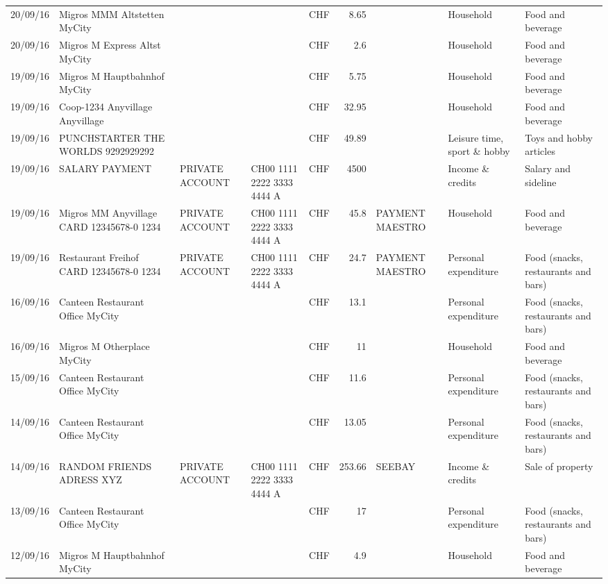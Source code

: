 \begin{landscape}
\begin{table}[h]
\begin{center}
\begin{tabular}{rllllrlll}
		20/09/16 & Migros MMM Altstetten    MyCity &       &       & CHF   & 8.65  &       & Household & Food and beverage \\
		20/09/16 & Migros M Express Altst   MyCity &       &       & CHF   & 2.6   &       & Household & Food and beverage \\
		19/09/16 & Migros M Hauptbahnhof    MyCity &       &       & CHF   & 5.75  &       & Household & Food and beverage \\
		19/09/16 & Coop-1234 Anyvillage    Anyvillage &       &       & CHF   & 32.95 &       & Household & Food and beverage \\
		19/09/16 & PUNCHSTARTER THE WORLDS   9292929292 &       &       & CHF   & 49.89 &       & Leisure time, sport \& hobby & Toys and hobby articles \\
		19/09/16 & SALARY PAYMENT & PRIVATE ACCOUNT & CH00 1111 2222 3333 4444 A & CHF   & 4500  &       & Income \& credits & Salary and sideline \\
		19/09/16 & Migros MM Anyvillage CARD 12345678-0 1234 & PRIVATE ACCOUNT & CH00 1111 2222 3333 4444 A & CHF   & 45.8  & PAYMENT MAESTRO & Household & Food and beverage \\
		19/09/16 & Restaurant Freihof CARD 12345678-0 1234 & PRIVATE ACCOUNT & CH00 1111 2222 3333 4444 A & CHF   & 24.7  & PAYMENT MAESTRO & Personal expenditure & Food (snacks, restaurants and bars) \\
		16/09/16 & Canteen Restaurant Office      MyCity &       &       & CHF   & 13.1  &       & Personal expenditure & Food (snacks, restaurants and bars) \\
		16/09/16 & Migros M Otherplace   MyCity &       &       & CHF   & 11    &       & Household & Food and beverage \\
		15/09/16 & Canteen Restaurant Office      MyCity &       &       & CHF   & 11.6  &       & Personal expenditure & Food (snacks, restaurants and bars) \\
		14/09/16 & Canteen Restaurant Office      MyCity &       &       & CHF   & 13.05 &       & Personal expenditure & Food (snacks, restaurants and bars) \\
		14/09/16 & RANDOM FRIENDS ADRESS XYZ & PRIVATE ACCOUNT & CH00 1111 2222 3333 4444 A & CHF   & 253.66 & SEEBAY & Income \& credits & Sale of property \\
		13/09/16 & Canteen Restaurant Office      MyCity &       &       & CHF   & 17    &       & Personal expenditure & Food (snacks, restaurants and bars) \\
		12/09/16 & Migros M Hauptbahnhof    MyCity &       &       & CHF   & 4.9   &       & Household & Food and beverage \\

\end{tabular}
\end{center}
\end{table}
\end{landscape}
